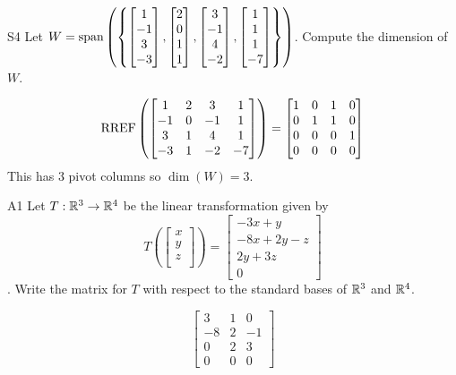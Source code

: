 \documentclass{sbgLAquiz}
\begin{document}
\begin{problem}{S4}  
Let $W={\rm span}\left( \left\{ \begin{bmatrix} 1 \\ -1 \\ 3 \\ -3 \end{bmatrix},\begin{bmatrix} 2 \\ 0 \\ 1 \\ 1 \end{bmatrix}, \begin{bmatrix} 3 \\ -1 \\ 4 \\ -2 \end{bmatrix},  \begin{bmatrix} 1 \\ 1 \\ 1 \\ -7 \end{bmatrix} \right\}\right)$.  Compute the dimension of $W$.
\end{problem}
\begin{solution}
$$ \operatorname{RREF} \left( \begin{bmatrix} 1 & 2 & 3 & 1 \\ -1 & 0 & -1 & 1 \\ 3 & 1 & 4 & 1 \\ -3 & 1 & -2 & -7 \end{bmatrix} \right) =  \begin{bmatrix} 1 & 0 & 1 & 0 \\ 0 & 1 & 1 & 0 \\ 0 & 0 & 0 & 1 \\ 0 & 0 & 0 & 0\end{bmatrix}$$
This has 3 pivot columns so $\dim(W)=3$.
\end{solution}


\begin{extract}\newpage\end{extract}
\begin{problem}{A1}
Let $T: \mathbb{R}^3\rightarrow \mathbb{R}^4$ be the linear transformation given by $$T\left(\begin{bmatrix} x \\ y \\ z \\  \end{bmatrix} \right) = \begin{bmatrix} -3x+y \\ -8x+2y-z \\ 2y+3z \\ 0 \end{bmatrix}$$.  Write the matrix for $T$ with respect to the standard bases of $\mathbb{R}^3$ and $\mathbb{R}^4$.
\end{problem}
\begin{solution}
$$\begin{bmatrix} 3 & 1 & 0 \\ -8 & 2 & -1 \\ 0 & 2 & 3 \\ 0 & 0 & 0 \end{bmatrix}$$
\end{solution}
\end{document}

